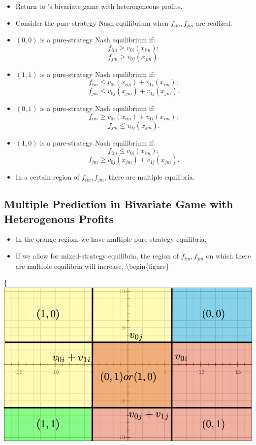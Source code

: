 \documentclass[
]{book}
\providecommand{\tightlist}{%
  \setlength{\itemsep}{0pt}\setlength{\parskip}{0pt}}
\begin{document}
\begin{itemize}
\tightlist
\item
  Return to \citet{tamerIncompleteSimultaneousDiscrete2003}'s bivariate game with heterogeneous profits.
\item
  Consider the pure-strategy Nash equilibrium when \(f_{im}, f_{jm}\) are realized.
\item
  \((0, 0)\) is a pure-strategy Nash equilibrium if:
  \[
  f_{im} \ge v_{0i}(x_{im});
  \]
  \[
  f_{jm} \ge v_{0j}(x_{jm}).
  \]
\item
  \((1, 1)\) is a pure-strategy Nash equilibrium if:
  \[
  f_{im} \le v_{0i}(x_{im}) + v_{1i}(x_{im});
  \]
  \[
  f_{jm} \le v_{0j}(x_{jm}) + v_{1j}(x_{jm}).
  \]
\item
  \((0, 1)\) is a pure-strategy Nash equilibrium if:
  \[
  f_{im} \ge v_{0i}(x_{im}) + v_{1i}(x_{im});
  \]
  \[
  f_{jm} \le v_{0j}(x_{jm}).
  \]
\item
  \((1, 0)\) is a pure-strategy Nash equilibrium if:
  \[
  f_{im} \le v_{0i}(x_{im});
  \]
  \[
  f_{jm} \ge v_{0j}(x_{jm}) + v_{1j}(x_{jm}).
  \]
\item
  In a certain region of \(f_{im}, f_{jm}\), there are multiple equilibria.
\end{itemize}

\hypertarget{multiple-prediction-in-bivariate-game-with-heterogenous-profits}{%
\subsection{Multiple Prediction in Bivariate Game with Heterogenous Profits}\label{multiple-prediction-in-bivariate-game-with-heterogenous-profits}}

\begin{itemize}
\tightlist
\item
  In the orange region, we have multiple pure-strategy equilibria.
\item
  If we allow for mixed-strategy equilibria, the region of \(f_{im}, f_{jm}\) on which there are multiple equilibria will increase.
  \textbackslash begin\{figure\}
\end{itemize}

\{\centering \includegraphics[width=0.8\linewidth]{figuretable/bivariateentry}
\end{document}
